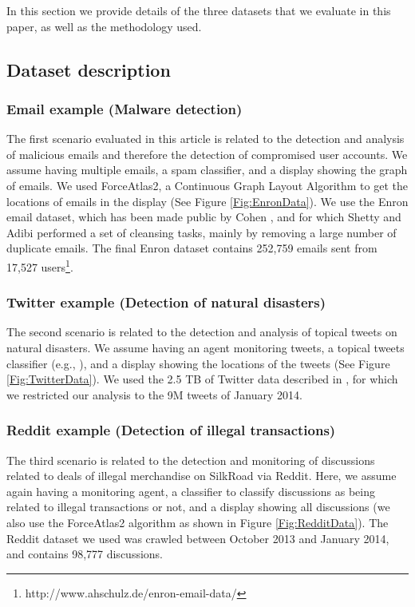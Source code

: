 In this section we provide details of the three datasets that we evaluate in this paper, as well as the methodology used.
\subsection{Dataset description}

\subsubsection{Email example (Malware detection)}
The first scenario evaluated in this article is related to the detection and analysis of malicious emails and therefore the detection of compromised user accounts. We assume having multiple emails, a spam classifier, and a display showing the graph of emails. We used ForceAtlas2, a Continuous Graph Layout Algorithm \cite{Jacomy2014} to get the locations of emails in the display (See Figure \ref{Fig:EnronData}).
We use the Enron email dataset, which has been made public by Cohen  \cite{Klimt2004}, and for which Shetty and Adibi \cite{Shetty2004} performed a set of
cleansing tasks, mainly by removing a large number of duplicate emails.  The final Enron dataset contains 252,759 emails sent from 17,527 users\footnote{http://www.ahschulz.de/enron-email-data/}.


\subsubsection{Twitter example (Detection of natural disasters)}
The second scenario is related to the detection and analysis of topical tweets on natural disasters. We assume having an agent monitoring tweets, a topical tweets classifier (e.g., \cite{Iman2017}), and a display showing the locations of the tweets (See Figure \ref{Fig:TwitterData}).  We used the  2.5 TB of Twitter data described in  \cite{Iman2017}, for which we restricted our analysis to the 9M tweets of January 2014.


\subsubsection{Reddit example (Detection of illegal transactions)}
The third scenario is related to the detection and monitoring of discussions related to deals of illegal merchandise on SilkRoad via Reddit. Here, we assume again having a monitoring agent, a classifier to classify discussions as being related to illegal transactions or not, and a display showing all discussions (we also use the ForceAtlas2 algorithm as shown in Figure \ref{Fig:RedditData}).
The Reddit dataset we used was crawled between October 2013 and January 2014, and contains 98,777 discussions.



